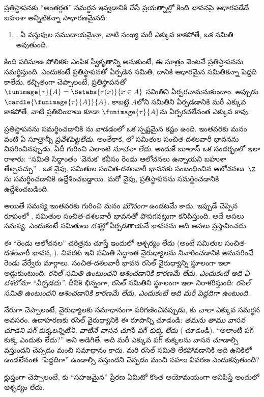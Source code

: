 \documentclass[../../../include/open-logic-section]{subfiles}
\begin{document}

ప్రతిస్థాపనకు ``అంతర్గత'' సమర్థన ఇవ్వడానికి చేసే ప్రయత్నాల్లో
కింది భావనపై ఆధారపడేదే బహుశా అన్నిటికన్నా సాధారణమైనది:
\begin{enumerate}
	\item[] \limofsize. ఏ వస్తువుల సముదాయమైనా, వాటి సంఖ్య మరీ ఎక్కువ కాకపోతే, ఒక సమితి అవుతుంది.
\end{enumerate}
కింది పరిమాణ పోలికకు ఎంపిక స్వీకృతాన్ని అనుకుంటే, ఈ సూత్రం వెంటనే ప్రతిస్థాపనను సమర్థిస్తుంది. ఎందుకంటే ప్రతిస్థాపనతో ఏర్పడిన సమితి, దానికి ఆధారమైన సమితికన్నా పెద్దది కాలేదు.
కచ్చితంగా చెప్పాలంటే, ప్రతిస్థాపనతో
$\funimage{\tau}{A} = \Setabs{\tau(x)}{x \in A}$ సమితిని
ఏర్పరచామనుకుందాం. అప్పుడు $\cardle{\funimage{\tau}{A}}{A}$.
కాబట్టి $A$లోని  సమితిని
ఏర్పడడానికి మరీ ఎక్కువ కాకపోతే, వాటి ప్రతిబింబాలు కూడా
$\funimage{\tau}{A}$ను ఏర్పరచలేనంత ఎక్కువ కావు.

ప్రతిస్థాపనను సమర్థించడానికి \limofsize{}ను వాడడంలో ఒక స్పష్టమైన కష్టం ఉంది. ఇంతవరకు మనం \limofsize{} వంటి ఏ సూత్రాన్నీ \emph{ప్రవేశపెట్టలేదు}. అంతేకాక, లో సమితుల సంచిత-దశలవారీ భావనను వివరించినప్పుడు, ఏదీ \limofsize{} గురించి ఎలాంటి \emph{సూచనా లేదు}. అందుకే బూలాస్ ఒక సందర్భంలో ఇలా రాశారు: ``సమితి సిద్ధాంతం `వెనుక' కనీసం రెండు ఆలోచనలు ఉన్నాయని బహుశా తేల్చవచ్చు'' \citeyearpar[p.~19]{Boolos1989}. ఒక వైపు, సమితుల సంచిత-దశలవారీ భావనకు సంబంధించిన ఆలోచనలు~$\Z$ను సమర్థించడానికి ఉద్దేశించబడ్డాయి. మరో వైపు, \limofsize{} ప్రతిస్థాపనను సమర్థించడానికి ఉద్దేశించబడింది.

అయితే సమస్య ఇంతవరకు \limofsize{} గురించి మనం \emph{మౌనంగా} ఉండటమే కాదు. ఇప్పుడే చెప్పిన రూపంలో \limofsize{}, సమితుల సంచిత-దశలవారీ భావనతో పొసగనట్టుగా కనిపిస్తుంది. అదే అసలు సమస్య. ఎందుకంటే సమితులు \emph{దశల్లో} ఏర్పడతాయనే భావనను అది అసలు ప్రస్తావించదు.

ఈ ``రెండు ఆలోచనల'' చరిత్రను చూస్తే ఇందులో ఆశ్చర్యం లేదు (అంటే సమితుల సంచిత-దశలవారీ భావన, \limofsize). చివరకు ఇవి సమితి సిద్ధాంత వైరుధ్యాలను నివారించడానికి
అనుసరించే రెండు వేర్వేరు మార్గాలు. సంచిత-దశలవారీ భావన రసెల్ వైరుధ్యాన్ని స్థూలంగా ఇలా అడ్డుకుంటుంది: \emph{రసెల్ సమితి ఉంటుందని ఆశించడానికి కారణమే లేదు, ఎందుకంటే అది ఏ దశలోనూ ``ఏర్పడదు''}. దీనికి భిన్నంగా, \limofsize{} రసెల్ సమితిని స్థూలంగా ఇలా నిరాకరిస్తుంది: \emph{రసెల్ సమితి ఉంటుందని ఆశించడానికి కారణమే లేదు, ఎందుకంటే అది మరీ పెద్దదిగా ఉంటుంది}.

నేరుగా చెప్పాలంటే, వైరుధ్యాలకు సమాధానంగా పరిగణించినప్పుడు, \limofsize{}కు \emph{చాలా} ఎక్కువ సమర్థన అవసరం. ఉదాహరణకు రసెల్ వైరుధ్యానికి ఈ రూపాన్ని చూడండి: \emph{తమను తాము వాసన చూడని పగ్ కుక్కలన్నిటినీ, వాటినే వాసన చూసే పగ్ కుక్క లేదు} ( చూడండి). ``అలాంటి పగ్ కుక్క ఎందుకు లేదు?'' అని అడిగితే, అది మరీ ఎక్కువ పగ్ కుక్కలను వాసన చూడాల్సి వస్తుందని చెప్పడం మంచి సమాధానం కాదు. మరి రసెల్ సమితి లేకపోవడానికి అది ఉనికిలో ఉండలేనంత ``పెద్దదిగా'' ఉండాల్సి వస్తుందని చెప్పడం మంచి సహజ వివరణ ఎందుకవుతుంది?

క్లుప్తంగా చెప్పాలంటే, \limofsize{}కు ``సహజమైన'' ప్రేరణ ఏమిటో
కొంత అయోమయంగా అనిపిస్తే అందులో ఆశ్చర్యం లేదు.
\end{document}
